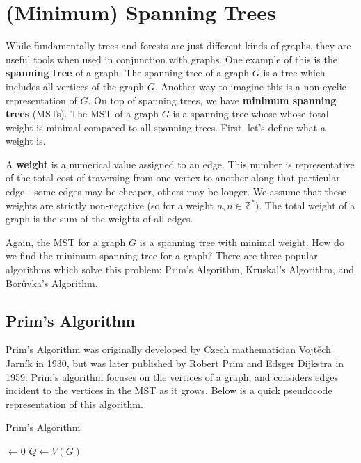 \section{(Minimum) Spanning Trees}
While fundamentally trees and forests are just different kinds of graphs, they are useful tools when used in conjunction with graphs. One example of this is the \textbf{spanning tree} of a graph. The spanning tree of a graph $G$ is a tree which includes all vertices of the graph $G$. Another way to imagine this is a non-cyclic representation of $G$. On top of spanning trees, we have \textbf{minimum spanning trees} (MSTs). The MST of a graph $G$ is a spanning tree whose whose total weight is minimal compared to all spanning trees. First, let's define what a weight is.

A \textbf{weight} is a numerical value assigned to an edge. This number is representative of the total cost of traversing from one vertex to another along that particular edge - some edges may be cheaper, others may be longer. We assume that these weights are strictly non-negative (so for a weight $n, n \in \mathbb{Z}^*$). The total weight of a graph is the sum of the weights of all edges.

Again, the MST for a graph $G$ is a spanning tree with minimal weight. How do we find the minimum spanning tree for a graph? There are three popular algorithms which solve this problem: Prim's Algorithm, Kruskal's Algorithm, and Bor\r{u}vka's Algorithm.
\subsection{Prim's Algorithm}
Prim's Algorithm was originally developed by Czech mathematician Vojt\v{e}ch Jarn\'{i}k in 1930, but was later published by Robert Prim and Edsger Dijkstra in 1959\cite{PrimsAlgo}. Prim's algorithm focuses on the vertices of a graph, and considers edges incident to the vertices in the MST as it grows. Below is a quick pseudocode representation of this algorithm\cite{IntroToAlgo}.

\begin{algorithm}
    \DontPrintSemicolon
    \caption{Prim's Algorithm}


     $\gets 0$\;
    $Q \gets V(G)$\;
\end{algorithm}


